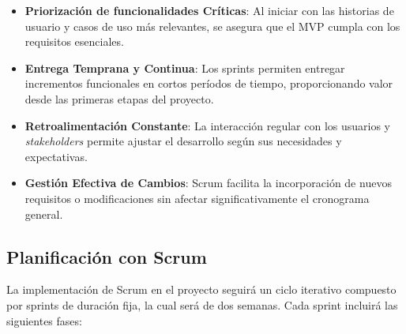 \begin{itemize} 
	\item \textbf{Priorización de funcionalidades Críticas}: Al iniciar con las historias de usuario y casos de uso más relevantes, se asegura que el MVP cumpla con los requisitos esenciales. 
	\item \textbf{Entrega Temprana y Continua}: Los sprints permiten entregar incrementos funcionales en cortos períodos de tiempo, proporcionando valor desde las primeras etapas del proyecto. 
	\item \textbf{Retroalimentación Constante}: La interacción regular con los usuarios y \textit{stakeholders} permite ajustar el desarrollo según sus necesidades y expectativas. 
	\item \textbf{Gestión Efectiva de Cambios}: Scrum facilita la incorporación de nuevos requisitos o modificaciones sin afectar significativamente el cronograma general. 
\end{itemize}


\subsection{Planificación con Scrum}

La implementación de Scrum en el proyecto seguirá un ciclo iterativo compuesto por sprints de duración fija, la cual será de dos semanas. Cada sprint incluirá las siguientes fases:

